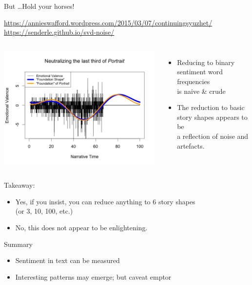 \documentclass[aspectratio=169,usenames,dvipsnames]{beamer}
\begin{document}
\begin{frame}{But \dots Hold your horses!}
    \begin{reference}
        \url{https://annieswafford.wordpress.com/2015/03/07/continuingsyuzhet/} \\
        \url{https://senderle.github.io/svd-noise/}
    \end{reference}

    \begin{columns}
            \includegraphics[width=0.9\linewidth]{fig/joycenoise}
    \begin{itemize}
        \item Reducing  to binary sentiment word frequencies \\
            is naive \& crude
        \item The reduction to basic story shapes appears to be \\
            a reflection of noise and artefacts.
    \end{itemize}
    \end{columns}

    \pause
    Takeaway:
    \begin{itemize}
        \item Yes, if you insist, you can reduce anything to 6 story shapes \\
            (or 3, 10, 100, etc.)
        \item No, this does not appear to be enlightening.
    \end{itemize}
\end{frame}

\begin{frame}{Summary}
    \begin{itemize}
        \item Sentiment in text can be measured
        \item Interesting patterns may emerge; but caveat emptor
    \end{itemize}
\end{frame}
\end{document}
